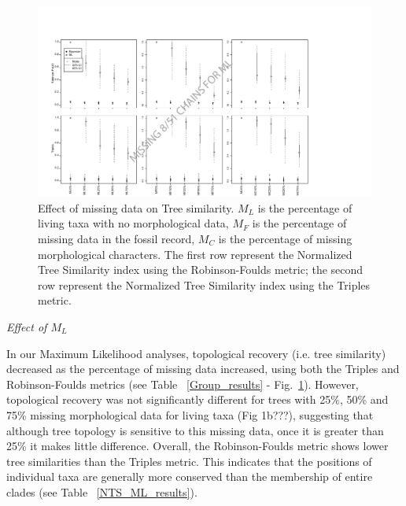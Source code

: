 \documentclass[12pt,letterpaper]{article}
\renewcommand{\subsection}[1]{%
\bigskip
\begin{center}
\begin{large}
\normalfont\itshape #1
\end{large}
\end{center}}
\begin{document}
\begin{figure} 
\centering
\includegraphics[keepaspectratio=true]{Figures/TEM_Fig-results-BW.pdf}
\caption{Effect of missing data on Tree similarity.
$M_L$ is the percentage of living taxa with no morphological data,
$M_F$ is the percentage of missing data in the fossil record,
$M_C$ is the percentage of missing morphological characters.
The first row represent the Normalized Tree Similarity index using the Robinson-Foulds metric;
the second row represent the Normalized Tree Similarity index using the Triples metric.}
\label{Fig_Results}
\end{figure}


\subsection{Effect of $M_L$}
In our Maximum Likelihood analyses, topological recovery (i.e. tree similarity) decreased as the percentage of missing data increased, using both the Triples and Robinson-Foulds metrics (see Table ~\ref{Group_results} - Fig.~\ref{Fig_Results}).
However, topological recovery was not significantly different for trees with 25\%, 50\% and 75\% missing morphological data for living taxa (Fig 1b???), %
suggesting that although tree topology is sensitive to this missing data, once it is greater than 25\% it makes little difference. Overall, the Robinson-Foulds metric shows lower tree similarities than the Triples metric. This indicates that the positions of individual taxa are generally more conserved than the membership of entire clades (see Table ~\ref{NTS_ML_results}).
\end{document}
